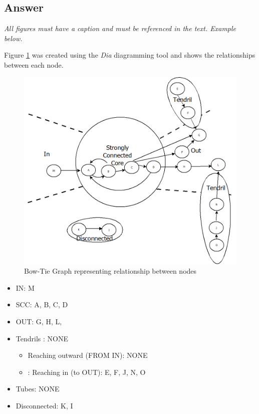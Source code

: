 \documentclass[12pt]{article}
\begin{document}
\subsection*{Answer}

\emph{All figures must have a caption and must be referenced in the text. Example below.}

Figure \ref{fig:bowTieGraph} was created using the \textit{Dia} diagramming tool \cite{dia} and shows the relationships between each node.

\begin{figure}[h]
    \centering
    \includegraphics[trim=0 20 10 50, clip, width=\textwidth] {Q1/Q1.png}
    \caption{Bow-Tie Graph representing relationship between nodes}
    \label{fig:bowTieGraph}
\end{figure}

\begin{itemize}
  \item IN: M
  \item SCC: A, B, C, D
  \item OUT: G, H, L,
  \item Tendrils : NONE
	\begin{itemize}
		\item Reaching outward (FROM IN): NONE
		\item: Reaching in (to OUT): E, F, J, N, O
	\end{itemize}
\item Tubes: NONE
\item Disconnected: K, I
\end{itemize}
\end{document}
